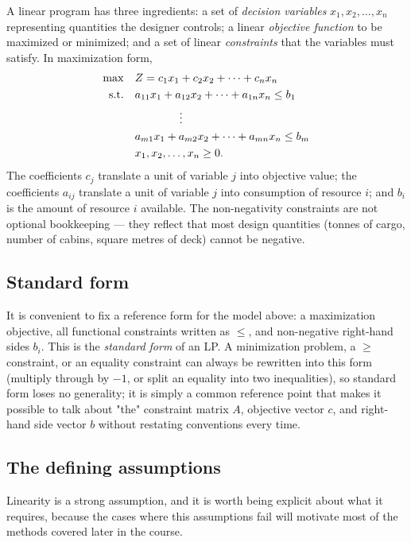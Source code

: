 A linear program has three ingredients: a set of \emph{decision variables}
$x_1, x_2, \ldots, x_n$ representing quantities the designer controls; a
linear \emph{objective function} to be maximized or minimized; and a set of
linear \emph{constraints} that the variables must satisfy. In maximization
form,
\begin{align}
  \max \quad & Z = c_1 x_1 + c_2 x_2 + \cdots + c_n x_n \label{eq:lp-obj}\\
  \text{s.t.} \quad & a_{11}x_1 + a_{12}x_2 + \cdots + a_{1n}x_n \leq b_1 \notag\\
  & \qquad\qquad \vdots \notag\\
  & a_{m1}x_1 + a_{m2}x_2 + \cdots + a_{mn}x_n \leq b_m \notag\\
  & x_1, x_2, \ldots, x_n \geq 0. \notag
\end{align}
The coefficients $c_j$ translate a unit of variable $j$ into objective
value; the coefficients $a_{ij}$ translate a unit of variable $j$ into
consumption of resource $i$; and $b_i$ is the amount of resource $i$
available. The non-negativity constraints are not optional bookkeeping —
they reflect that most design quantities (tonnes of cargo, number of
cabins, square metres of deck) cannot be negative.

\subsection{Standard form}
\label{sec:standard-form}

It is convenient to fix a reference form for the model above: a
maximization objective, all functional constraints written as
$\leq$, and non-negative right-hand sides $b_i$. This is the \emph{standard
form} of an LP. A minimization problem, a $\geq$ constraint, or an equality
constraint can always be rewritten into this form (multiply through by
$-1$, or split an equality into two inequalities), so standard form loses
no generality; it is simply a common reference point that makes it
possible to talk about "the" constraint matrix $A$, objective vector $c$,
and right-hand side vector $b$ without restating conventions every time.

\subsection{The defining assumptions}
\label{sec:lp-assumptions}

Linearity is a strong assumption, and it is worth being explicit about
what it requires, because the cases where this assumptions fail will motivate most of the methods covered later in the course.

